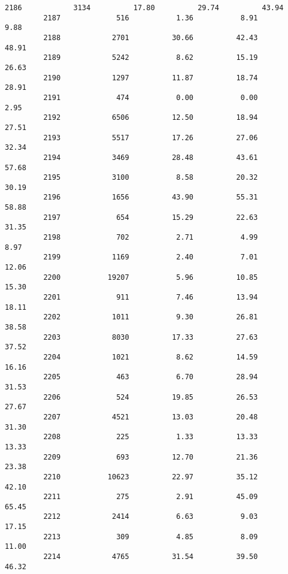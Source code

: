 \documentclass[11pt]{llncs}
\begin{document}
\begin{Verbatim}[commandchars=\\\{\}]
         2186            3134          17.80          29.74          43.94   
         2187             516           1.36           8.91           9.88   
         2188            2701          30.66          42.43          48.91   
         2189            5242           8.62          15.19          26.63   
         2190            1297          11.87          18.74          28.91   
         2191             474           0.00           0.00           2.95   
         2192            6506          12.50          18.94          27.51   
         2193            5517          17.26          27.06          32.34   
         2194            3469          28.48          43.61          57.68   
         2195            3100           8.58          20.32          30.19   
         2196            1656          43.90          55.31          58.88   
         2197             654          15.29          22.63          31.35   
         2198             702           2.71           4.99           8.97   
         2199            1169           2.40           7.01          12.06   
         2200           19207           5.96          10.85          15.30   
         2201             911           7.46          13.94          18.11   
         2202            1011           9.30          26.81          38.58   
         2203            8030          17.33          27.63          37.52   
         2204            1021           8.62          14.59          16.16   
         2205             463           6.70          28.94          31.53   
         2206             524          19.85          26.53          27.67   
         2207            4521          13.03          20.48          31.30   
         2208             225           1.33          13.33          13.33   
         2209             693          12.70          21.36          23.38   
         2210           10623          22.97          35.12          42.10   
         2211             275           2.91          45.09          65.45   
         2212            2414           6.63           9.03          17.15   
         2213             309           4.85           8.09          11.00   
         2214            4765          31.54          39.50          46.32   
         

\end{Verbatim}
\end{document}
